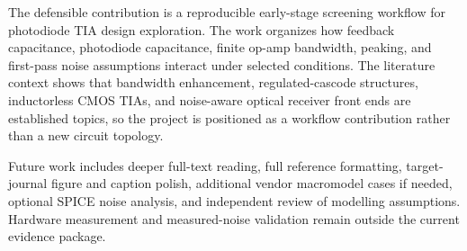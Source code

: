 The defensible contribution is a reproducible early-stage screening workflow for photodiode TIA design exploration. The work organizes how feedback capacitance, photodiode capacitance, finite op-amp bandwidth, peaking, and first-pass noise assumptions interact under selected conditions. The literature context shows that bandwidth enhancement, regulated-cascode structures, inductorless CMOS TIAs, and noise-aware optical receiver front ends are established topics, so the project is positioned as a workflow contribution rather than a new circuit topology.

Future work includes deeper full-text reading, full reference formatting, target-journal figure and caption polish, additional vendor macromodel cases if needed, optional SPICE noise analysis, and independent review of modelling assumptions. Hardware measurement and measured-noise validation remain outside the current evidence package.
